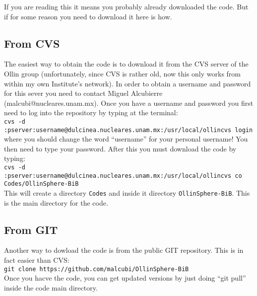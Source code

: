 \documentclass[12pt]{article}
\begin{document}
If you are reading this it means you probably already downloaded the
code.  But if for some reason you need to download it here is how. \\

\subsection{From CVS}

The easiest way to obtain the code is to download it from the CVS
server of the Ollin group (unfortunately, since CVS is rather old, now
this only works from within my own Institute's network). In order to
obtain a username and password for this sever you need to contact
Miguel Alcubierre (malcubi@nucleares.unam.mx). Once you have a
username and password you first need to log into the repository by
typing at the terminal: \\

\texttt{\footnotesize cvs -d
  :pserver:username@dulcinea.nucleares.unam.mx:/usr/local/ollincvs
  login} \\

where you should change the word ``username'' for your personal
username! You then need to type your password.  After this you must
download the code by typing: \\

\texttt{\footnotesize cvs -d
  :pserver:username@dulcinea.nucleares.unam.mx:/usr/local/ollincvs co
  Codes/OllinSphere-BiB} \\

This will create a directory \texttt{Codes} and inside it directory
\texttt{OllinSphere-BiB}. This is the main directory for the code.

\subsection{From GIT}

Another way to dowload the code is from the public GIT repository.
This is in fact easier than CVS: \\

\texttt{\footnotesize git clone https://github.com/malcubi/OllinSphere-BiB} \\

Once you hacve the code, you can get updated versions by just doing
``git pull'' inside the code main directory.


\end{document}
